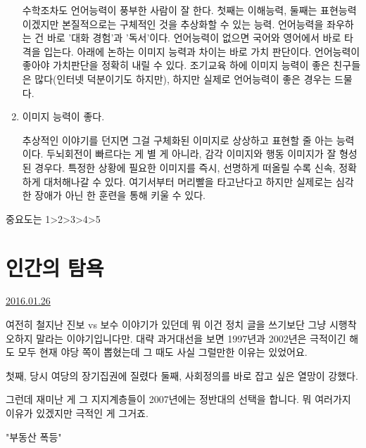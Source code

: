 \begin{enumerate}
    수학조차도 언어능력이 풍부한 사람이 잘 한다.
    첫째는 이해능력, 둘째는 표현능력이겠지만 본질적으로는 구체적인 것을 추상화할 수 있는 능력.
    언어능력을 좌우하는 건 바로 '대화 경험'과 '독서'이다. 언어능력이 없으면 국어와 영어에서 바로 타격을 입는다.
    아래에 논하는 이미지 능력과 차이는 바로 가치 판단이다. 언어능력이 좋아야 가치판단을 정확히 내릴 수 있다.
    조기교육 하에 이미지 능력이 좋은 친구들은 많다(인터넷 덕분이기도 하지만), 하지만 실제로 언어능력이 좋은 경우는 드물다.
    \vspace{5mm}

    \item 이미지 능력이 좋다.
    \vspace{5mm}

    추상적인 이야기를 던지면 그걸 구체화된 이미지로 상상하고 표현할 줄 아는 능력이다.
    두뇌회전이 빠르다는 게 별 게 아니라, 감각 이미지와 행동 이미지가 잘 형성된 경우다.
    특정한 상황에 필요한 이미지를 즉시, 선명하게 떠올릴 수록 신속, 정확하게 대처해나갈 수 있다.
    여기서부터 머리빨을 타고난다고 하지만 실제로는 심각한 장애가 아닌 한 훈련을 통해 키울 수 있다.
    \vspace{5mm}
\end{enumerate}
중요도는 1>2>3>4>5
\vspace{5mm}





\section{인간의 탐욕}
\href{https://www.kockoc.com/Apoc/610237}{2016.01.26}

\vspace{5mm}

여전히 철지난 진보 vs 보수 이야기가 있던데
뭐 이건 정치 글을 쓰기보단 그냥 시행착오하지 말라는 이야기입니다만.
대략 과거대선을 보면
1997년과 2002년은 극적이긴 해도 모두 현재 야당 쪽이 뽑혔는데
그 때도 사실 그럴만한 이유는 있었어요.
\vspace{5mm}

첫째, 당시 여당의 장기집권에 질렸다
둘째, 사회정의를 바로 잡고 싶은 열망이 강했다.
\vspace{5mm}

그런데 재미난 게 그 지지계층들이 2007년에는 정반대의 선택을 합니다.
뭐 여러가지 이유가 있겠지만 극적인 게 그거죠.
\vspace{5mm}

"부동산 폭등"
\vspace{5mm}

